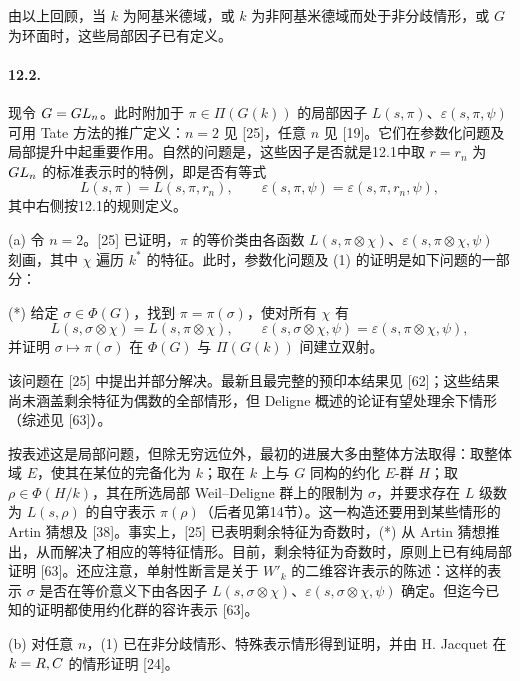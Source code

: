 由以上回顾，当 $k$ 为阿基米德域，或 $k$ 为非阿基米德域而处于非分歧情形，或 $G$ 为环面时，这些局部因子已有定义。

\paragraph*{12.2.} 现令 $G=GL_n$。此时附加于 $\pi\in\Pi(G(k))$ 的局部因子 $L(s,\pi)$、$\varepsilon(s,\pi,\psi)$ 可用 Tate 方法的推广定义：$n=2$ 见 [25]，任意 $n$ 见 [19]。它们在参数化问题及局部提升中起重要作用。自然的问题是，这些因子是否就是12.1中取 $r=r_n$ 为 $GL_n$ 的标准表示时的特例，即是否有等式
\begin{equation}
 L(s,\pi)=L(s,\pi,r_n),\qquad
 \varepsilon(s,\pi,\psi)=\varepsilon(s,\pi,r_n,\psi),\tag{1}
\end{equation}
其中右侧按12.1的规则定义。

(a) 令 $n=2$。[25] 已证明，$\pi$ 的等价类由各函数 $L(s,\pi\otimes\chi)$、$\varepsilon(s,\pi\otimes\chi,\psi)$ 刻画，其中 $\chi$ 遍历 $k^*$ 的特征。此时，参数化问题及 (1) 的证明是如下问题的一部分：

(*) 给定 $\sigma\in\Phi(G)$，找到 $\pi=\pi(\sigma)$，使对所有 $\chi$ 有
\begin{equation}
 L(s,\sigma\otimes\chi)=L(s,\pi\otimes\chi),\qquad
 \varepsilon(s,\sigma\otimes\chi,\psi)=\varepsilon(s,\pi\otimes\chi,\psi),\tag{2}
\end{equation}
并证明 $\sigma\mapsto\pi(\sigma)$ 在 $\Phi(G)$ 与 $\Pi(G(k))$ 间建立双射。

该问题在 [25] 中提出并部分解决。最新且最完整的预印本结果见 [62]；这些结果尚未涵盖剩余特征为偶数的全部情形，但 Deligne 概述的论证有望处理余下情形（综述见 [63]）。

按表述这是局部问题，但除无穷远位外，最初的进展大多由整体方法取得：取整体域 $E$，使其在某位的完备化为 $k$；取在 $k$ 上与 $G$ 同构的约化 $E$-群 $H$；取 $\rho\in\Phi(H/k)$，其在所选局部 Weil--Deligne 群上的限制为 $\sigma$，并要求存在 $L$ 级数为 $L(s,\rho)$ 的自守表示 $\pi(\rho)$（后者见第14节）。这一构造还要用到某些情形的 Artin 猜想及 [38]。事实上，[25] 已表明剩余特征为奇数时，(*) 从 Artin 猜想推出，从而解决了相应的等特征情形。目前，剩余特征为奇数时，原则上已有纯局部证明 [63]。还应注意，单射性断言是关于 $W'_k$ 的二维容许表示的陈述：这样的表示 $\sigma$ 是否在等价意义下由各因子 $L(s,\sigma\otimes\chi)$、$\varepsilon(s,\sigma\otimes\chi,\psi)$ 确定。但迄今已知的证明都使用约化群的容许表示 [63]。

(b) 对任意 $n$，(1) 已在非分歧情形、特殊表示情形得到证明，并由 H. Jacquet 在 $k=R,C$ 的情形证明 [24]。

